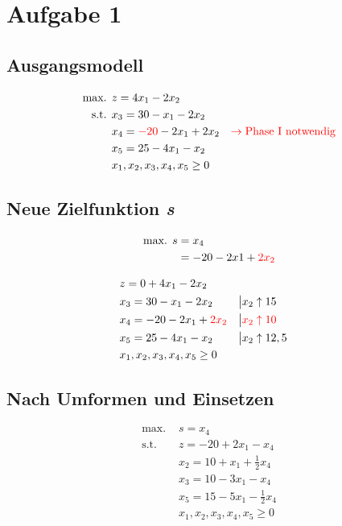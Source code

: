 \documentclass[a4paper,11pt]{article}
\begin{document}
\raggedright %


\section*{Aufgabe 1}
\subsection*{Ausgangsmodell}
\begin{align*}
\text{max. } & z = 4x_1 - 2x_2 \\
\text{s.t. } & x_3 = 30 - x_1 - 2x_2 \\
& x_4 = {\color{red} -20} - 2x_1 + 2x_2  & \color{red} \to \text{Phase I notwendig} \\
& x_5 = 25 -4x_1 - x_2 \\
& x_1, x_2, x_3, x_4, x_5 \ge 0 \\
\end{align*}

\subsection*{Neue Zielfunktion \emph{s}}
\begin{align*}
\text{max. } s &= x_4 \\
&= -20 - 2x1 + {\color{red} 2x_2}
\end{align*}

\begin{align*}
& z = 0 + 4x_1 - 2x_2 \\
& x_3 = 30 - x_1 - 2x_2 &&\big| x_2 \uparrow 15 \\
& x_4 = -20 - 2x_1 + {\color{red} 2x_2} &&\big| \color{red} x_2 \uparrow 10 \\
& x_5 = 25 -4x_1 - x_2 &&\big| x_2 \uparrow 12,5 \\
& x_1, x_2, x_3, x_4, x_5 \ge 0 \\
\end{align*}

\subsection*{Nach Umformen und Einsetzen}
\begin{align*}
\text{max. } & s = x_4 \\
\text{s.t. } & z = -20 + 2x_1 - x_4 \\
& x_2 = 10 + x_1 + \frac{1}{2}x_4 \\
& x_3 = 10 - 3x_1 - x_4 \\
& x_5 = 15 - 5x_1 - \frac{1}{2}x_4 \\
& x_1, x_2, x_3, x_4, x_5 \ge 0
\end{align*}
\end{document}
